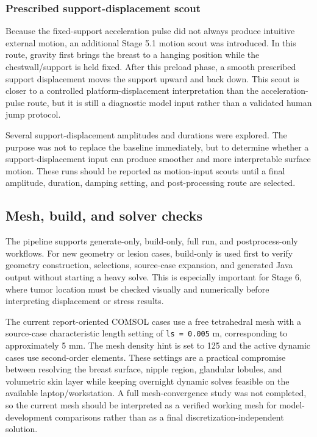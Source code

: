 \subsubsection{Prescribed support-displacement scout}

Because the fixed-support acceleration pulse did not always produce intuitive external motion, an additional Stage 5.1 motion scout was introduced. In this route, gravity first brings the breast to a hanging position while the chestwall/support is held fixed. After this preload phase, a smooth prescribed support displacement moves the support upward and back down. This scout is closer to a controlled platform-displacement interpretation than the acceleration-pulse route, but it is still a diagnostic model input rather than a validated human jump protocol.

Several support-displacement amplitudes and durations were explored. The purpose was not to replace the baseline immediately, but to determine whether a support-displacement input can produce smoother and more interpretable surface motion. These runs should be reported as motion-input scouts until a final amplitude, duration, damping setting, and post-processing route are selected.

\subsection{Mesh, build, and solver checks}

The pipeline supports generate-only, build-only, full run, and postprocess-only workflows. For new geometry or lesion cases, build-only is used first to verify geometry construction, selections, source-case expansion, and generated Java output without starting a heavy solve. This is especially important for Stage 6, where tumor location must be checked visually and numerically before interpreting displacement or stress results.

The current report-oriented COMSOL cases use a free tetrahedral mesh with a source-case characteristic length setting of \texttt{ls = 0.005} m, corresponding to approximately 5 mm. The mesh density hint is set to 125 and the active dynamic cases use second-order elements. These settings are a practical compromise between resolving the breast surface, nipple region, glandular lobules, and volumetric skin layer while keeping overnight dynamic solves feasible on the available laptop/workstation. A full mesh-convergence study was not completed, so the current mesh should be interpreted as a verified working mesh for model-development comparisons rather than as a final discretization-independent solution.

